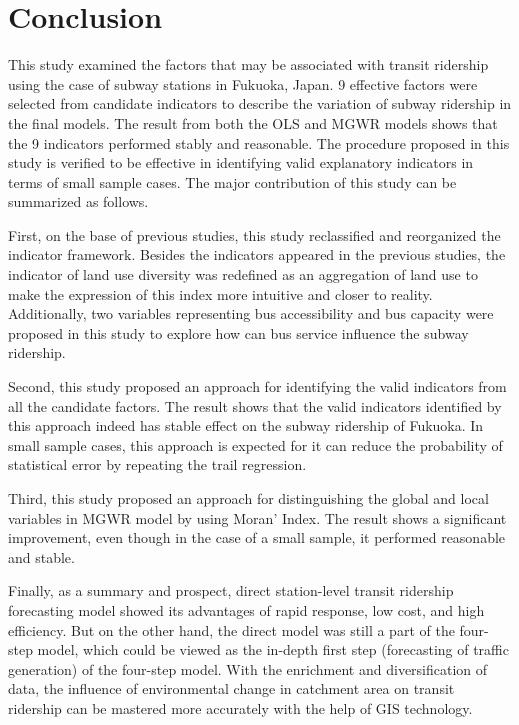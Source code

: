 \documentclass[utf8]{article}
\begin{document}
\section{Conclusion}
 \indent
 
 This study examined the factors that may be associated with transit ridership using the case of subway stations in Fukuoka, Japan. 9 effective factors were selected from candidate indicators to describe the variation of subway ridership in the final models. The result from both the OLS and MGWR models shows that the 9 indicators performed stably and reasonable. The procedure proposed in this study is verified to be effective in identifying valid explanatory indicators in terms of small sample cases. The major contribution of this study can be summarized as follows.
 
 First, on the base of previous studies, this study reclassified and reorganized the indicator framework. Besides the indicators appeared in the previous studies, the indicator of land use diversity was redefined as an aggregation of land use to make the expression of this index more intuitive and closer to reality. Additionally, two variables representing bus accessibility and bus capacity were proposed in this study to explore how can bus service influence the subway ridership.
 
 Second, this study proposed an approach for identifying the valid indicators from all the candidate factors. The result shows that the valid indicators identified by this approach indeed has stable effect on the subway ridership of Fukuoka. In small sample cases, this approach is expected for it can reduce the probability of statistical error by repeating the trail regression.
 
 Third, this study proposed an approach for distinguishing the global and local variables in MGWR model by using Moran’ Index. The result shows a significant improvement, even though in the case of a small sample, it performed reasonable and stable.
 
 Finally, as a summary and prospect, direct station-level transit ridership forecasting model showed its advantages of rapid response, low cost, and high efficiency. But on the other hand, the direct model was still a part of the four-step model, which could be viewed as the in-depth first step (forecasting of traffic generation) of the four-step model. With the enrichment and diversification of data, the influence of environmental change in catchment area on transit ridership can be mastered more accurately with the help of GIS technology.
 
\clearpage


\end{document}
